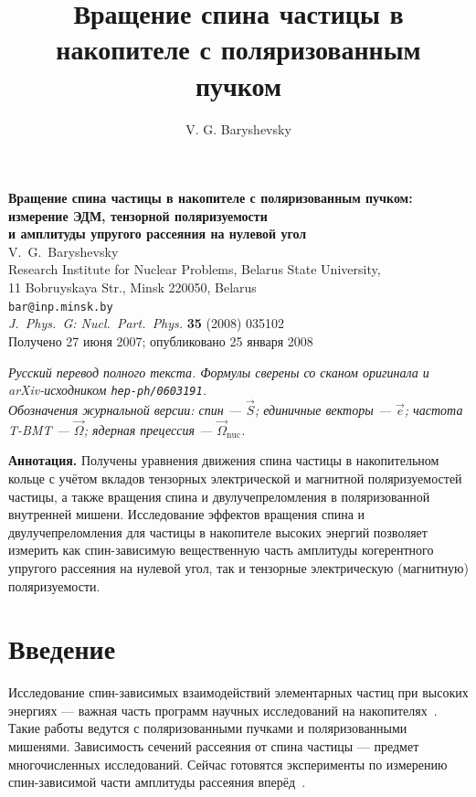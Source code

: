 \documentclass[11pt,a4paper]{article}
\title{Вращение спина частицы в накопителе с поляризованным пучком}
\author{V. G. Baryshevsky}
\date{}
\begin{document}
\begin{center}
{\LARGE\bfseries Вращение спина частицы в накопителе с поляризованным пучком:\\
измерение ЭДМ, тензорной поляризуемости\\
и амплитуды упругого рассеяния на нулевой угол}\\[1.1em]
{\large V.~G.~Baryshevsky}\\[0.5em]
{\small Research Institute for Nuclear Problems, Belarus State University,\\
11 Bobruyskaya Str., Minsk 220050, Belarus}\\[0.3em]
{\small\texttt{bar@inp.minsk.by}}\\[0.7em]
{\small\textit{J.\ Phys.\ G: Nucl.\ Part.\ Phys.} \textbf{35} (2008) 035102}\\
{\small Получено 27 июня 2007; опубликовано 25 января 2008}
\end{center}

\begin{center}
{\small\textit{Русский перевод полного текста. Формулы сверены со сканом оригинала
и arXiv-исходником \texttt{hep-ph/0603191}.\\
Обозначения журнальной версии: спин --- $\vec{S}$; единичные векторы --- $\vec{e}$;
частота T-BMT --- $\vec{\Omega}$; ядерная прецессия --- $\vec{\Omega}_{\mathrm{nuc}}$.}}
\end{center}

\vspace{0.8em}
\noindent\textbf{Аннотация.}
Получены уравнения движения спина частицы в накопительном кольце с учётом
вкладов тензорных электрической и магнитной поляризуемостей частицы, а также
вращения спина и двулучепреломления в поляризованной внутренней мишени.
Исследование эффектов вращения спина и двулучепреломления для частицы
в накопителе высоких энергий позволяет измерить как спин-зависимую вещественную
часть амплитуды когерентного упругого рассеяния на нулевой угол, так и тензорные
электрическую (магнитную) поляризуемости.

\tableofcontents
\newpage

\section{Введение}

Исследование спин-зависимых взаимодействий элементарных частиц при высоких
энергиях --- важная часть программ научных исследований на накопителях~\cite{Lehar,Engels,Kacharava}.
Такие работы ведутся с поляризованными пучками и поляризованными мишенями.
Зависимость сечений рассеяния от спина частицы --- предмет многочисленных
исследований. Сейчас готовятся эксперименты по измерению спин-зависимой
части амплитуды рассеяния вперёд~\cite{Engels,Kacharava}.
\end{document}
